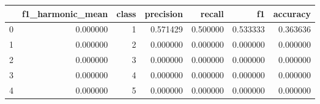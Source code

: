 \begin{tabular}{lrrrrrr}
\toprule
 & f1_harmonic_mean & class & precision & recall & f1 & accuracy \\
\midrule
0 & 0.000000 & 1 & 0.571429 & 0.500000 & 0.533333 & 0.363636 \\
1 & 0.000000 & 2 & 0.000000 & 0.000000 & 0.000000 & 0.000000 \\
2 & 0.000000 & 3 & 0.000000 & 0.000000 & 0.000000 & 0.000000 \\
3 & 0.000000 & 4 & 0.000000 & 0.000000 & 0.000000 & 0.000000 \\
4 & 0.000000 & 5 & 0.000000 & 0.000000 & 0.000000 & 0.000000 \\
\bottomrule
\end{tabular}
